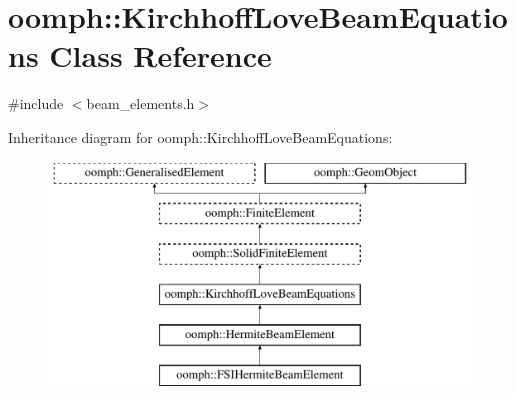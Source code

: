 \hypertarget{classoomph_1_1KirchhoffLoveBeamEquations}{}\section{oomph\+:\+:Kirchhoff\+Love\+Beam\+Equations Class Reference}
\label{classoomph_1_1KirchhoffLoveBeamEquations}


{\ttfamily \#include $<$beam\+\_\+elements.\+h$>$}

Inheritance diagram for oomph\+:\+:Kirchhoff\+Love\+Beam\+Equations\+:\begin{figure}[H]
\begin{center}
\leavevmode
\includegraphics[height=6.000000cm]{classoomph_1_1KirchhoffLoveBeamEquations}
\end{center}
\end{figure}
